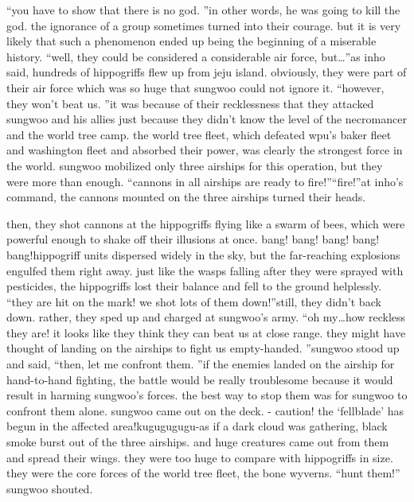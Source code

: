 “you have to show that there is no god.
”in other words, he was going to kill the god.
the ignorance of a group sometimes turned into their courage.
 but it is very likely that such a phenomenon ended up being the beginning of a miserable history.
“well, they could be considered a considerable air force, but…”as inho said, hundreds of hippogriffs flew up from jeju island.
obviously, they were part of their air force which was so huge that sungwoo could not ignore it.
“however, they won’t beat us.
”it was because of their recklessness that they attacked sungwoo and his allies just because they didn’t know the level of the necromancer and the world tree camp.
the world tree fleet, which defeated wpu’s baker fleet and washington fleet and absorbed their power, was clearly the strongest force in the world.
sungwoo mobilized only three airships for this operation, but they were more than enough.
“cannons in all airships are ready to fire!”“fire!”at inho’s command, the cannons mounted on the three airships turned their heads.


then, they shot cannons at the hippogriffs flying like a swarm of bees, which were powerful enough to shake off their illusions at once.
bang! bang! bang! bang! bang!hippogriff units dispersed widely in the sky, but the far-reaching explosions engulfed them right away.
just like the wasps falling after they were sprayed with pesticides, the hippogriffs lost their balance and fell to the ground helplessly.
“they are hit on the mark! we shot lots of them down!”still, they didn’t back down.
 rather, they sped up and charged at sungwoo’s army.
“oh my…how reckless they are! it looks like they think they can beat us at close range.
 they might have thought of landing on the airships to fight us empty-handed.
”sungwoo stood up and said, “then, let me confront them.
”if the enemies landed on the airship for hand-to-hand fighting, the battle would be really troublesome because it would result in harming sungwoo’s forces.
 the best way to stop them was for sungwoo to confront them alone.
sungwoo came out on the deck.
- caution! the ‘fellblade’ has begun in the affected area!kugugugugu-as if a dark cloud was gathering, black smoke burst out of the three airships.
and huge creatures came out from them and spread their wings.
 they were too huge to compare with hippogriffs in size.
they were the core forces of the world tree fleet, the bone wyverns.
“hunt them!” sungwoo shouted.


 